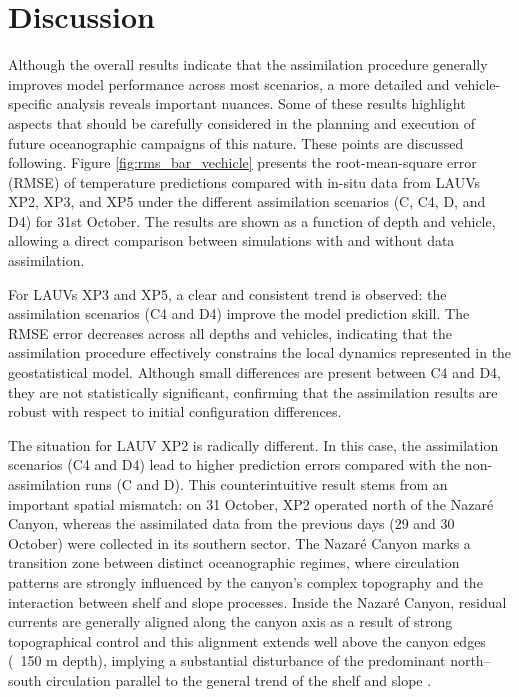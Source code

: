 \section{Discussion}
\label{sec:disc}





Although the overall results indicate that the assimilation procedure generally improves model performance across most scenarios, a more detailed and vehicle-specific analysis reveals important nuances. Some of these results highlight aspects that should be carefully considered in the planning and execution of future oceanographic campaigns of this nature. These points are discussed following.
Figure \ref{fig:rms_bar_vechicle} presents the root-mean-square error (RMSE) of temperature predictions compared with in-situ data from LAUVs XP2, XP3, and XP5 under the different assimilation scenarios (C, C4, D, and D4) for 31st October. The results are shown as a function of depth and vehicle, allowing a direct comparison between simulations with and without data assimilation.

For LAUVs XP3 and XP5, a clear and consistent trend is observed: the assimilation scenarios (C4 and D4) improve the model prediction skill. The RMSE error decreases across all depths and vehicles, indicating that the assimilation procedure effectively constrains the local dynamics represented in the geostatistical model. Although small differences are present between C4 and D4, they are not statistically significant, confirming that the assimilation results are robust with respect to initial configuration differences.

The situation for LAUV XP2 is radically different. In this case, the assimilation scenarios (C4 and D4) lead to higher prediction errors compared with the non-assimilation runs (C and D). This counterintuitive result stems from an important spatial mismatch: on 31 October, XP2 operated north of the Nazaré Canyon, whereas the assimilated data from the previous days (29 and 30 October) were collected in its southern sector. The Nazaré Canyon marks a transition zone between distinct oceanographic regimes, where circulation patterns are strongly influenced by the canyon’s complex topography and the interaction between shelf and slope processes. Inside the Nazaré Canyon, residual currents are generally aligned along the canyon axis as a result of strong topographical control and this alignment extends well above the canyon edges (~150 m depth), implying a substantial disturbance of the predominant north–south circulation parallel to the general trend of the shelf and slope \cite{tyler2009europe,relvas2007physical,guerreiro2014influence}. 


